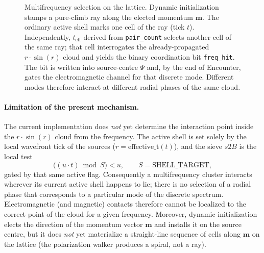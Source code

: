 \documentclass{ijuc}
\begin{document}
\begin{figure}[htbp]
\caption{Multifrequency selection on the lattice. Dynamic initialization stamps a pure-climb ray along the elected momentum $\boldsymbol{m}$. The ordinary active shell marks one cell of the ray (tick $t$). Independently, $t_{\mathrm{eff}}$ derived from \texttt{pair\_count} selects another cell of the same ray; that cell interrogates the already-propagated $r\cdot\sin(r)$ cloud and yields the binary coordination bit \texttt{freq\_hit}. The bit is written into source-centre $\Psi$ and, by the end of Encounter, gates the electromagnetic channel for that discrete mode. Different modes therefore interact at different radial phases of the same cloud.}
\label{fig:multi-frequency}
\end{figure}

\paragraph{Limitation of the present mechanism.}
The current implementation does \emph{not} yet determine the interaction point inside the $r\cdot\sin(r)$ cloud from the frequency. The active shell is set solely by the local wavefront tick of the sources ($r=\mathrm{effective\_t}(t)$), and the sieve $s2B$ is the local test
\[
\bigl((u\cdot t)\bmod S\bigr)<u,\qquad S=\mathrm{SHELL\_TARGET},
\]
gated by that same active flag. Consequently a multifrequency cluster interacts wherever its current active shell happens to lie; there is no selection of a radial phase that corresponds to a particular mode of the discrete spectrum. Electromagnetic (and magnetic) contacts therefore cannot be localized to the correct point of the cloud for a given frequency. Moreover, dynamic initialization elects the direction of the momentum vector $\boldsymbol{m}$ and installs it on the source centre, but it does \emph{not} yet materialize a straight-line sequence of cells along $\boldsymbol{m}$ on the lattice (the polarization walker produces a spiral, not a ray).
\end{document}
